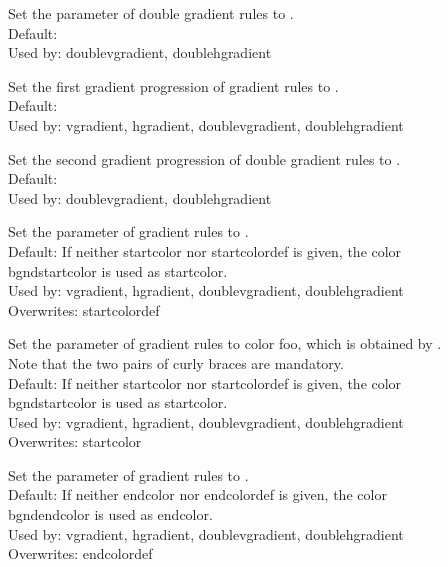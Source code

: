 \begin{slide}
\begin{description}
  \item[] Set the 
    parameter of double gradient rules to .\\
    Default: \\
    Used by: doublevgradient, doublehgradient

  \item[]
    Set the first gradient progression of gradient rules to .\\
    Default: \\
    Used by: vgradient, hgradient, doublevgradient, doublehgradient

  \item[]
    Set the second gradient progression of double gradient rules to .\\
    Default: \\
    Used by: doublevgradient, doublehgradient

  \item[]
    Set the  parameter of gradient rules to .\\
    Default: If neither startcolor nor startcolordef is given, the color
      bgndstartcolor is used as startcolor.\\
    Used by: vgradient, hgradient, doublevgradient, doublehgradient\\
    Overwrites: startcolordef

  \item[]
    Set the  parameter of gradient rules to color foo, which
    is obtained by .
    Note that the two pairs of curly braces are mandatory.\\
    Default: If neither startcolor nor startcolordef is given, the color
      bgndstartcolor is used as startcolor.\\
    Used by: vgradient, hgradient, doublevgradient, doublehgradient\\
    Overwrites: startcolor

  \item[]
    Set the  parameter of gradient rules to .\\
    Default: If neither endcolor nor endcolordef is given, the color
      bgndendcolor is used as endcolor.\\
    Used by: vgradient, hgradient, doublevgradient, doublehgradient\\
    Overwrites: endcolordef


\end{description}
\end{slide}
